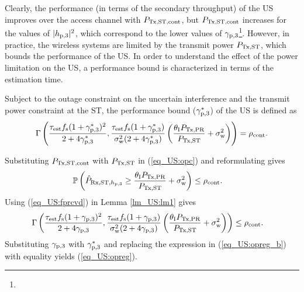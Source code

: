 Clearly, the performance (in terms of the secondary throughput) of the US improves over the access channel with $P_{\text{Tx,ST,cont}}$, but $P_{\text{Tx,ST,cont}}$ increases for the values of $|h_{\text{p,3}}|^2$, which correspond to the lower values of ${\gamma}_{\text{p,3}}$\footnote{}.
However, in practice, the wireless systems are limited by the transmit power $P_{\text{Tx,ST}}$, which bounds the performance of the US. In order to understand the effect of the power limitation on the US, a performance bound is characterized in terms of the estimation time.
 
\begin{coro} \label{cor_US:cor1}
\normalfont
Subject to the outage constraint on the uncertain interference and the transmit power constraint at the ST, the performance bound (${\gamma}_{\text{p,3}}^*$) of the US is defined as %
\begin{align}
\Gamma\left(\frac{\tau_{\text{est}} f_{\text{s}} (1 + {\gamma}_{\text{p,3}}^*)^2}{2 + 4 {\gamma}_{\text{p,3}}^*}, \frac{\tau_{\text{est}} f_{\text{s}} (1  + {\gamma}_{\text{p,3}}^*)}{\sigma^2_{\text{w}} (2 + 4 {\gamma}_{\text{p,3}}^*)} \left( \frac{\theta_{\text{I}} P_{\text{Tx,PR}}}{P_{\text{Tx,ST}}} + \sigma^2_{\text{w}}  \right)  \right) = \rho_{\text{cont}}. \label{eq_US:opreg}  
\end{align}
\end{coro}
\begin{IEEEproof}[Solution]
Substituting $P_{\text{Tx,ST,cont}}$ with $P_{\text{Tx,ST}}$ in (\ref{eq_US:opc}) and reformulating gives 
\begin{align}
\mathbb P\left( \hat{P}_{\text{Rx,ST,$h_{\text{p,3}}$}} \ge \frac{\theta_{\text{I}} P_{\text{Tx,PR}}}{P_{\text{Tx,ST}}} + \sigma^2_{\text{w}} \right) &\le \rho_{\text{cont}}. \label{eq_US:opreg_a} 
\end{align}
Using (\ref{eq_US:fprcvd}) in Lemma \ref{lm_US:lm1} gives
\begin{align}
\Gamma\left(\frac{\tau_{\text{est}} f_{\text{s}} (1 + {\gamma}_{\text{p,3}})^2}{2 + 4 {\gamma}_{\text{p,3}}}, \frac{\tau_{\text{est}} f_{\text{s}} (1  + {\gamma}_{\text{p,3}})}{\sigma^2_{\text{w}} (2 + 4 {\gamma}_{\text{p,3}})} \left( \frac{\theta_{\text{I}} P_{\text{Tx,PR}}}{P_{\text{Tx,ST}}} + \sigma^2_{\text{w}}  \right)  \right) &\le \rho_{\text{cont}}. \label{eq_US:opreg_b} 
\end{align}
Substituting ${\gamma}_{\text{p,3}}$ with ${\gamma}_{\text{p,3}}^*$ and replacing the expression in (\ref{eq_US:opreg_b}) with equality yields (\ref{eq_US:opreg}). 
\end{IEEEproof}
